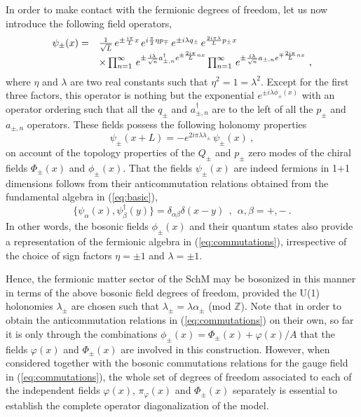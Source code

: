 \documentclass[a4paper,11pt]{article}
\def\Z{\mathbb Z}
\begin{document}
In order to make contact with the fermionic degrees of freedom, let
us now introduce the following field operators,
\begin{equation}
\begin{array}{r l}
\psi_\pm(x)=&\frac{1}{\sqrt{L}}\,e^{\pm\frac{i\pi}{L}x}\,
e^{i\frac{\pi}{2}\eta p_\mp}\,e^{\pm i\lambda q_\pm}\,
e^{\frac{2i\pi\lambda}{L}p_\pm x}\\
&\times \prod_{n=1}^\infty\,e^{\pm\frac{i\lambda}{\sqrt{n}}a^\dagger_{\pm,n}
e^{\pm\frac{2i\pi}{L}nx}}
\prod_{n=1}^\infty\,e^{\pm\frac{i\lambda}{\sqrt{n}}a_{\pm,n}
e^{\mp\frac{2i\pi}{L}nx}}\ ,
\end{array}
\label{eq:fermion}
\end{equation}
where $\eta$ and $\lambda$ are two real constants such that 
$\eta^2=1=\lambda^2$. Except for the first three factors, this
operator is nothing but the exponential $e^{\pm i\lambda\phi_\pm(x)}$
with an operator ordering such that all the $q_\pm$ and $a^\dagger_{\pm,n}$ 
are to the left of all the $p_\pm$ and $a_{\pm,n}$ operators. These fields 
possess the following holonomy properties
\begin{equation}
\psi_\pm(x+L)=-e^{2i\pi\lambda\lambda_\pm}\,\psi_\pm(x)\ ,
\end{equation}
on account of the topology properties of the $Q_\pm$ and $p_\pm$
zero modes of the chiral fields $\Phi_\pm(x)$ and $\phi_\pm(x)$.
That the fields $\psi_\pm(x)$ are indeed fermions in 1+1 dimensions follows
from their anticommutation relations obtained from the fundamental
algebra in (\ref{eq:basic}),
\begin{equation}
\{\psi_\alpha(x),\psi^\dagger_\beta(y)\}=\delta_{\alpha\beta}\delta(x-y)
\ \ ,\ \ \alpha,\beta=+,-\ .
\end{equation}
In other words, the bosonic fields $\phi_\pm(x)$
and their quantum states also provide a representation of the
fermionic algebra in (\ref{eq:commutations}), irrespective of the choice
of sign factors $\eta=\pm 1$ and $\lambda=\pm 1$. 

Hence, the fermionic matter sector of the SchM may be bosonized in 
this manner in terms of the above bosonic field degrees of freedom, provided
the U(1) holonomies $\lambda_\pm$ are chosen such that 
$\lambda_\pm=\lambda\alpha_\pm$ (mod $\Z$). Note that in order to obtain the 
anticommutation relations in (\ref{eq:commutations}) on their own,
so far it is only through the combinations 
$\phi_\pm(x)=\Phi_\pm(x)+\varphi(x)/A$ that the fields $\varphi(x)$ and 
$\Phi_\pm(x)$ are involved in this construction. However, when considered
together with the bosonic commutations relations for the gauge field
in (\ref{eq:commutations}), the whole set of degrees of freedom associated
to each of the independent fields $\varphi(x)$, $\pi_\varphi(x)$ and 
$\Phi_\pm(x)$ separately is essential to establish the complete operator 
diagonalization of the model.
\end{document}
